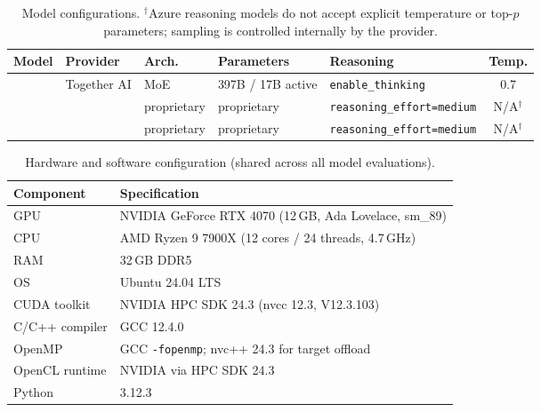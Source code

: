 

\begin{table}[htbp]
\centering
\caption{Model configurations. $^\dagger$Azure reasoning models do not accept explicit temperature or top-$p$ parameters; sampling is controlled internally by the provider.}
\label{tab:model-config}
\footnotesize
\begin{tabular}{@{}lllllc@{}}
\toprule
Model & Provider & Arch. & Parameters & Reasoning & Temp. \\
\midrule
\qwen{} & Together AI & MoE & 397B / 17B active & \texttt{enable\_thinking} & 0.7 \\
\gptnew{} & \gptprovider{} & proprietary & proprietary & \texttt{reasoning\_effort=medium} & N/A$^\dagger$ \\
\codex{} & \gptprovider{} & proprietary & proprietary & \texttt{reasoning\_effort=medium} & N/A$^\dagger$ \\
\bottomrule
\end{tabular}
\end{table}


\begin{table}[htbp]
\centering
\caption{Hardware and software configuration (shared across all model evaluations).}
\label{tab:hardware}
\small
\begin{tabular}{@{}ll@{}}
\toprule
Component & Specification \\
\midrule
GPU & NVIDIA GeForce RTX 4070 (12\,GB, Ada Lovelace, sm\_89) \\
CPU & AMD Ryzen 9 7900X (12 cores / 24 threads, 4.7\,GHz) \\
RAM & 32\,GB DDR5 \\
OS & Ubuntu 24.04 LTS \\
CUDA toolkit & NVIDIA HPC SDK 24.3 (nvcc 12.3, V12.3.103) \\
C/C++ compiler & GCC 12.4.0 \\
OpenMP & GCC \texttt{-fopenmp}; nvc++ 24.3 for target offload \\
OpenCL runtime & NVIDIA via HPC SDK 24.3 \\
Python & 3.12.3 \\
\bottomrule
\end{tabular}
\end{table}

